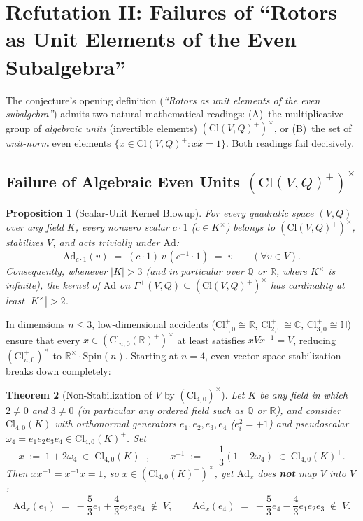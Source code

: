 \documentclass[11pt]{article}
\newtheorem{theorem}{Theorem}[section]
\newtheorem{proposition}[theorem]{Proposition}
\theoremstyle{definition}
\theoremstyle{remark}
\newcommand{\Cl}{\mathrm{Cl}}
\newcommand{\Spin}{\mathrm{Spin}}
\newcommand{\Ad}{\mathrm{Ad}}
\begin{document}
\section{Refutation II: Failures of ``Rotors as Unit Elements of the Even Subalgebra''}

The conjecture's opening definition (\emph{``Rotors as unit elements of the even subalgebra''}) admits two natural mathematical readings: (A)~the multiplicative group of \emph{algebraic units} (invertible elements) $(\Cl(V,Q)^+)^\times$, or (B)~the set of \emph{unit-norm} even elements $\{x \in \Cl(V,Q)^+ : x \widetilde{x} = 1\}$. Both readings fail decisively.

\subsection{Failure of Algebraic Even Units \texorpdfstring{$(\Cl(V,Q)^+)^\times$}{(Cl+)x}}

\begin{proposition}[Scalar-Unit Kernel Blowup]\label{prop:scalar-kernel}
For every quadratic space $(V,Q)$ over any field $K$, every nonzero scalar $c \cdot 1$ ($c \in K^\times$) belongs to $(\Cl(V,Q)^+)^\times$, stabilizes $V$, and acts trivially under $\Ad$:
\[
\Ad_{c \cdot 1}(v) \;=\; (c \cdot 1)\, v\, (c^{-1} \cdot 1) \;=\; v \qquad (\forall v \in V).
\]
Consequently, whenever $|K| > 3$ (and in particular over $\mathbb{Q}$ or $\mathbb{R}$, where $K^\times$ is infinite), the kernel of $\Ad$ on $\Gamma^+(V,Q) \subseteq (\Cl(V,Q)^+)^\times$ has cardinality at least $|K^\times| > 2$.
\end{proposition}

In dimensions $n \le 3$, low-dimensional accidents ($\Cl_{1,0}^+ \cong \mathbb{R}$, $\Cl_{2,0}^+ \cong \mathbb{C}$, $\Cl_{3,0}^+ \cong \mathbb{H}$) ensure that every $x \in (\Cl_{n,0}(\mathbb{R})^+)^\times$ at least satisfies $x V x^{-1} = V$, reducing $(\Cl_{n,0}^+)^\times$ to $\mathbb{R}^\times \cdot \Spin(n)$. Starting at $n = 4$, even vector-space stabilization breaks down completely:

\begin{theorem}[Non-Stabilization of $V$ by $(\Cl_{4,0}^+)^\times$]\label{thm:cl40-counterexample}
Let $K$ be any field in which $2 \ne 0$ and $3 \ne 0$ (in particular any ordered field such as $\mathbb{Q}$ or $\mathbb{R}$), and consider $\Cl_{4,0}(K)$ with orthonormal generators $e_1, e_2, e_3, e_4$ ($e_i^2 = +1$) and pseudoscalar $\omega_4 = e_1 e_2 e_3 e_4 \in \Cl_{4,0}(K)^+$. Set
\[
x \;:=\; 1 + 2 \omega_4 \;\in\; \Cl_{4,0}(K)^+, \qquad
x^{-1} \;:=\; -\frac{1}{3}(1 - 2 \omega_4) \;\in\; \Cl_{4,0}(K)^+.
\]
Then $x x^{-1} = x^{-1} x = 1$, so $x \in (\Cl_{4,0}(K)^+)^\times$, yet $\Ad_x$ does \textbf{not} map $V$ into $V$:
\[
\Ad_x(e_1) \;=\; -\frac{5}{3} e_1 + \frac{4}{3} e_2 e_3 e_4 \;\notin\; V, \qquad
\Ad_x(e_4) \;=\; -\frac{5}{3} e_4 - \frac{4}{3} e_1 e_2 e_3 \;\notin\; V.
\]
\end{theorem}
\end{document}
